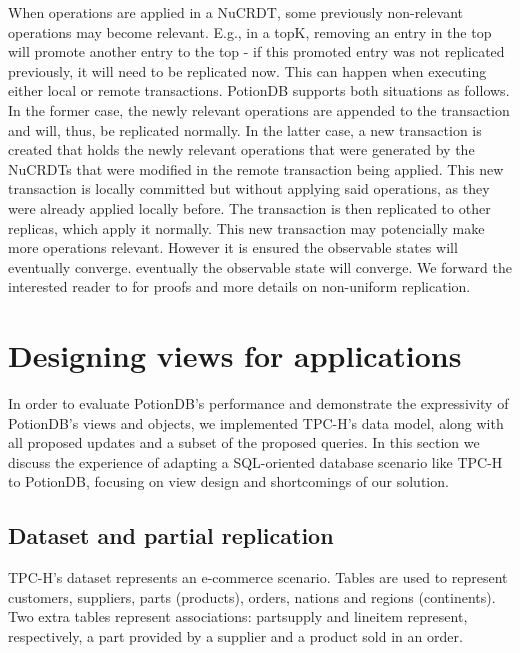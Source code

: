 \documentclass[sigconf, nonacm]{acmart}
\begin{document}
When operations are applied in a NuCRDT, some previously non-relevant operations may become relevant.
E.g., in a topK, removing an entry in the top will promote another entry to the top - if this promoted entry was not replicated previously, it will need to be replicated now.
This can happen when executing either local or remote transactions.
PotionDB supports both situations as follows.
In the former case, the newly relevant operations are appended to the transaction and will, thus, be replicated normally.
In the latter case, a new transaction is created that holds the newly relevant operations that were generated by the NuCRDTs that were modified in the remote transaction being applied.
This new transaction is locally committed but without applying said operations, as they were already applied locally before.
The transaction is then replicated to other replicas, which apply it normally.
This new transaction may potencially make more operations relevant.
However it is ensured the observable states will eventually converge.
eventually the observable state will converge.
We forward the interested reader to \cite{Cabrita17Nonuniform} for proofs and more details on non-uniform replication.

\section{Designing views for applications}
\label{sec:views_for_apps}

In order to evaluate PotionDB's performance and demonstrate the expressivity of PotionDB's views and objects, we implemented TPC-H's data model, along with all proposed updates and a subset of the proposed queries.
In this section we discuss the experience of adapting a SQL-oriented database scenario like TPC-H to PotionDB, focusing on view design and shortcomings of our solution.

\subsection{Dataset and partial replication}
\label{subsec:dataset}

TPC-H's dataset represents an e-commerce scenario. %
Tables are used to represent customers, suppliers, parts (products), orders, nations and regions (continents).
Two extra tables represent associations: partsupply and lineitem represent, respectively, a part provided by a supplier and a product sold in an order. %
\end{document}
